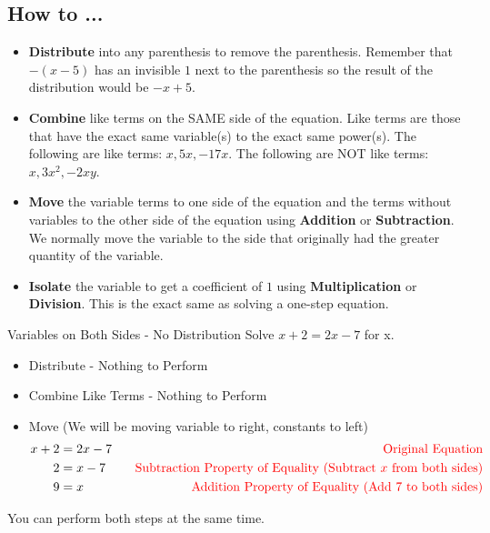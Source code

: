\subsection{How to ...}
\begin{itemize}
    \item \textbf{Distribute} into any parenthesis to remove the parenthesis. Remember that $-(x-5)$ has an invisible $1$ next to the parenthesis so the result of the distribution would be $-x+5$.
    \item \textbf{Combine} like terms on the SAME side of the equation. Like terms are those that have the exact same variable(s) to the exact same power(s). The following are like terms: $x, 5x, -17x$. The following are NOT like terms: $x, 3x^2, -2xy$.
    \item \textbf{Move} the variable terms to one side of the equation and the terms without variables to the other side of the equation using \textbf{Addition} or \textbf{Subtraction}. We normally move the variable to the side that originally had the greater quantity of the variable.
    \item \textbf{Isolate} the variable to get a coefficient of $1$ using \textbf{Multiplication} or \textbf{Division}. This is the exact same as solving a one-step equation.
\end{itemize}
\begin{example}{Variables on Both Sides - No Distribution}{}
    Solve $x+2=2x-7$ for x.
    \begin{itemize}
        \item Distribute - Nothing to Perform
        \item Combine Like Terms - Nothing to Perform
        \item Move (We will be moving variable to right, constants to left)
            \begin{align*}
                x+2&=2x-7&\;\;\;\textcolor{red}{\textrm{Original Equation}}\\
                2&=x-7&\;\;\;\textcolor{red}{\textrm{Subtraction Property of Equality (Subtract $x$ from both sides)}}\\
                9&=x&\;\;\;\textcolor{red}{\textrm{Addition Property of Equality (Add 7 to both sides)}}
            \end{align*}
    \end{itemize}
    You can perform both steps at the same time.
\end{example}
